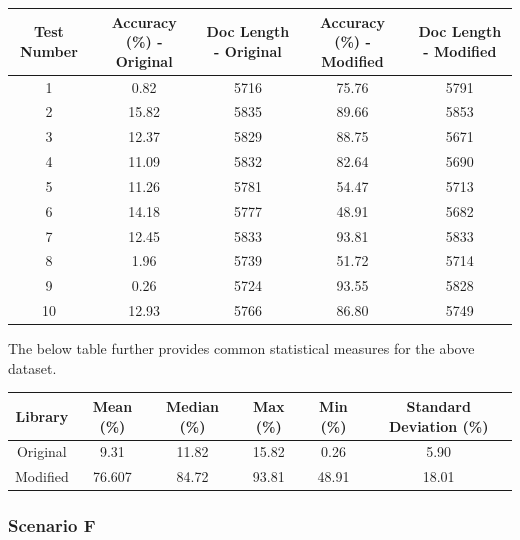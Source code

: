 \documentclass[9pt, titlepage]{article}
\begin{document}
  \begin{center}
    \begin{tabular}{||c c c c c||} 
      \hline
      Test Number & Accuracy (\%) - Original & Doc Length - Original & Accuracy (\%) - Modified & Doc Length - Modified \\ [0.5ex] 
      \hline\hline
      1 &  0.82 & 5716 & 75.76 & 5791 \\ 
      \hline
      2 & 15.82 & 5835 & 89.66 & 5853 \\ 
      \hline
      3 & 12.37 & 5829 & 88.75 & 5671 \\ 
      \hline
      4 & 11.09 & 5832 & 82.64 & 5690 \\ 
      \hline
      5 & 11.26 & 5781 & 54.47 & 5713 \\ 
      \hline
      6 & 14.18 & 5777 & 48.91 & 5682 \\ 
      \hline
      7 & 12.45 & 5833 & 93.81 & 5833 \\ 
      \hline
      8 &  1.96 & 5739 & 51.72 & 5714 \\ 
      \hline
      9 &  0.26 & 5724 & 93.55 & 5828 \\ 
      \hline
      10 & 12.93 & 5766 & 86.80 & 5749 \\ 
      \hline
    \end{tabular}
  \end{center}
  
  The below table further provides common statistical measures for the above dataset.\\

  \begin{center}
    \begin{tabular}{||c c c c c c||} 
      \hline
      Library & Mean (\%) & Median (\%) & Max (\%) & Min (\%) & Standard Deviation (\%) \\ [0.5ex] 
      \hline\hline
      Original & 9.31 & 11.82 & 15.82 & 0.26 & 5.90 \\ 
      \hline
      Modified & 76.607 & 84.72 & 93.81 & 48.91 & 18.01 \\
      \hline
    \end{tabular}
  \end{center}
  \hfill

  \subsubsection{Scenario F}
  
\end{document}

